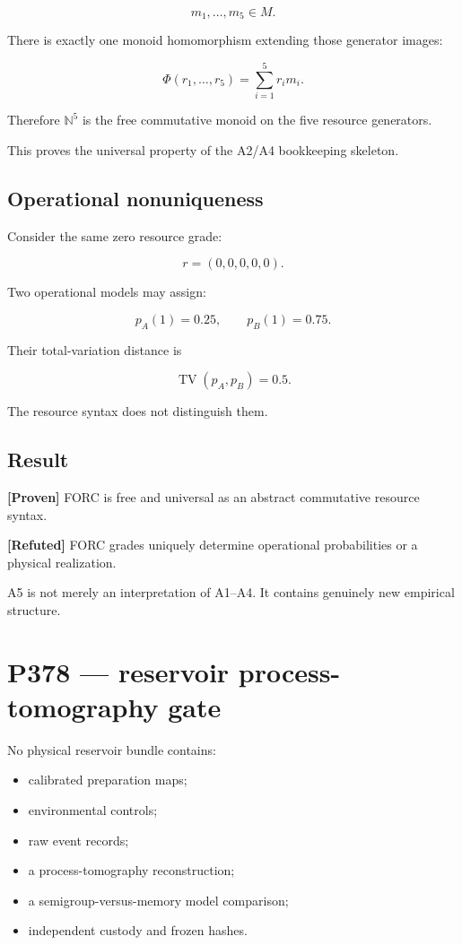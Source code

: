 \documentclass[11pt,a4paper,openany]{report}
\newcommand{\statusProven}{\textcolor{fingreen}{[Proven]}}
\newcommand{\statusRefuted}{\textcolor{finred}{[Refuted]}}
\begin{document}
\[
m_1,\ldots,m_5\in M.
\]

There is exactly one monoid homomorphism extending those generator images:

\[
\Phi(r_1,\ldots,r_5)
=
\sum_{i=1}^{5}r_im_i.
\]

Therefore \(\mathbb N^5\) is the free commutative monoid on the five resource generators.

This proves the universal property of the A2/\allowbreak{}A4 bookkeeping skeleton.

\section{Operational nonuniqueness}

Consider the same zero resource grade:

\[
r=(0,0,0,0,0).
\]

Two operational models may assign:

\[
p_A(1)=0.25,
\qquad
p_B(1)=0.75.
\]

Their total-variation distance is

\[
\operatorname{TV}(p_A,p_B)=0.5.
\]

The resource syntax does not distinguish them.

\section{Result}

\textbf{\statusProven{}} FORC is free and universal as an abstract commutative resource syntax.

\textbf{\statusRefuted{}} FORC grades uniquely determine operational probabilities or a physical realization.

A5 is not merely an interpretation of A1--A4. It contains genuinely new empirical structure.

\chapter{P378 --- reservoir process-tomography gate}

No physical reservoir bundle contains:

\begin{itemize}
\item 
calibrated preparation maps;

\item 
environmental controls;

\item 
raw event records;

\item 
a process-tomography reconstruction;

\item 
a semigroup-versus-memory model comparison;

\item 
independent custody and frozen hashes.

\end{itemize}
\end{document}
